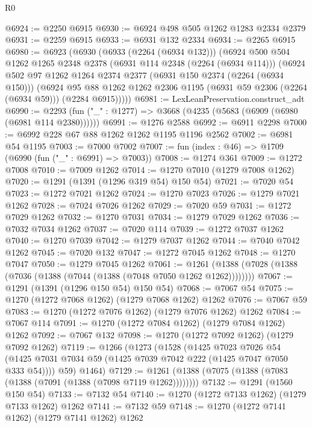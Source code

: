 \begin{lexlean}{R0}
\begin{coremodule}
@6924 := @2250 @6915
@6930 := @6924 @498 @505 @1262 @1283 @2334 @2379
@6931 := @2259 @6915
@6933 := @6931 @132 @2334
@6934 := @2265 @6915
@6980 := @6923
    (@6930
      (@6933 (@2264 (@6934 @132)))
      (@6924
        @500
        @504
        @1262
        @1265
        @2348
        @2378
        (@6931 @114 @2348 (@2264 (@6934 @114)))
        (@6924
          @502
          @97
          @1262
          @1264
          @2374
          @2377
          (@6931 @150 @2374 (@2264 (@6934 @150)))
          (@6924
            @95
            @88
            @1262
            @1262
            @2306
            @1195
            (@6931 @59 @2306 (@2264 (@6934 @59)))
            (@2284 @6915)))))
@6981 := LexLeanPreservation.construct_adt
@6990 := @2293 (fun ("_" : @1277) => @3668 (@4235 (@5683 (@6909 (@6980 (@6981 @114 @2380))))))
@6991 := @1276 @2588
@6992 := @6911 @2298
@7000 := @6992 @228 @67 @88 @1262 @1262 @1195 @1196 @2562
@7002 := @6981 @54 @1195
@7003 := @7000 @7002
@7007 := fun (index : @46) => @1709 (@6990 (fun ("_" : @6991) => @7003))
@7008 := @1274 @361
@7009 := @1272 @7008
@7010 := @7009 @1262
@7014 := @1270 @7010 (@1279 @7008 @1262)
@7020 := @1291 (@1391 (@1296 @319 @54) @150 @54)
@7021 := @7020 @54
@7023 := @1272 @7021 @1262
@7024 := @1270 @7023
@7026 := @1279 @7021 @1262
@7028 := @7024 @7026 @1262
@7029 := @7020 @59
@7031 := @1272 @7029 @1262
@7032 := @1270 @7031
@7034 := @1279 @7029 @1262
@7036 := @7032 @7034 @1262
@7037 := @7020 @114
@7039 := @1272 @7037 @1262
@7040 := @1270 @7039
@7042 := @1279 @7037 @1262
@7044 := @7040 @7042 @1262
@7045 := @7020 @132
@7047 := @1272 @7045 @1262
@7048 := @1270 @7047
@7050 := @1279 @7045 @1262
@7061 := @1261 (@1388 (@7028 (@1388 (@7036 (@1388 (@7044 (@1388 (@7048 @7050 @1262 @1262))))))))
@7067 := @1291 (@1391 (@1296 @150 @54) @150 @54)
@7068 := @7067 @54
@7075 := @1270 (@1272 @7068 @1262) (@1279 @7068 @1262) @1262
@7076 := @7067 @59
@7083 := @1270 (@1272 @7076 @1262) (@1279 @7076 @1262) @1262
@7084 := @7067 @114
@7091 := @1270 (@1272 @7084 @1262) (@1279 @7084 @1262) @1262
@7092 := @7067 @132
@7098 := @1270 (@1272 @7092 @1262) (@1279 @7092 @1262)
@7119 := @1266
    (@1273
      (@1528
        (@1425
          @7023
          @7026
          @54
          (@1425 @7031 @7034 @59 (@1425 @7039 @7042 @222 (@1425 @7047 @7050 @333 @54))))
        @59)
      @1464)
@7129 := @1261 (@1388 (@7075 (@1388 (@7083 (@1388 (@7091 (@1388 (@7098 @7119 @1262))))))))
@7132 := @1291 (@1560 @150 @54)
@7133 := @7132 @54
@7140 := @1270 (@1272 @7133 @1262) (@1279 @7133 @1262) @1262
@7141 := @7132 @59
@7148 := @1270 (@1272 @7141 @1262) (@1279 @7141 @1262) @1262

\end{coremodule}
\end{lexlean}
